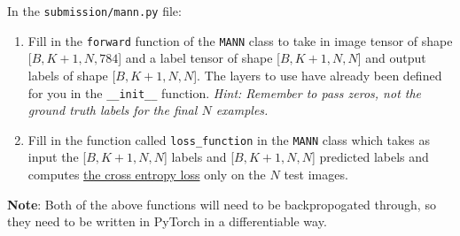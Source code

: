 \noindent In the \texttt{submission/mann.py} file:
\begin{enumerate}
    \item Fill in the \texttt{forward} function of the \texttt{MANN} class to take in image tensor of shape [$B, K+1, N, 784$] and a label tensor of shape [$B, K+1, N, N$] and output labels of shape [$B,K+1,N, N$]. The layers to use have already been defined for you in the \texttt{\_\_init\_\_} function. \textit{Hint: Remember to pass zeros, not the ground truth labels for the final $N$ examples.}
    \item  Fill in the function called \texttt{loss\_function} in the \texttt{MANN} class which takes as input the [$B,K+1,N, N$] labels and [$B,K+1,N, N$] predicted labels and computes \href{https://pytorch.org/docs/stable/generated/torch.nn.functional.cross_entropy.html#torch.nn.functional.cross_entropy}{the cross entropy loss} only on the $N$ test images. 
\end{enumerate}
\textbf{Note}: Both of the above functions will need to be backpropogated through, so they need to be written in PyTorch in a differentiable way.

\clearpage